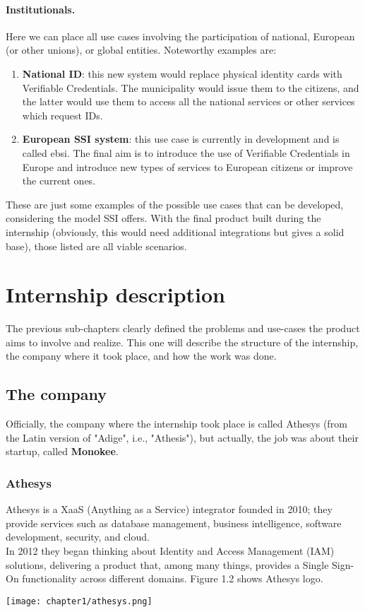 \paragraph{Institutionals.}
Here we can place all use cases involving the participation of national, 
European (or other unions), or global entities.
Noteworthy examples are:
\begin{enumerate}
    \item \textbf{National ID}: this new system would replace physical identity 
    cards with Verifiable Credentials. The municipality would issue them to the 
    citizens, and the latter would use them to access all the national services 
    or other services which request IDs.
    \item \textbf{European SSI system}: this use case is currently in development 
    and is called \acrfull{ebsi}. The final 
    aim is to introduce the use of Verifiable Credentials in Europe and introduce 
    new types of services to European citizens or improve the current 
    ones\cite{site:ebsi}.
\end{enumerate}
\vspace*{0.3cm}
These are just some examples of the possible use cases that can be developed, 
considering the model SSI offers.
With the final product built during the internship (obviously, this would need 
additional integrations but gives a solid base), those listed are all viable 
scenarios.
\section{Internship description}
The previous sub-chapters clearly defined the problems and use-cases the product 
aims to involve and realize. This one will describe the structure of the internship, 
the company where it took place, and how the work was done.
\subsection{The company}
Officially, the company where the internship took place is 
called Athesys (from the Latin version of "Adige", i.e., "Athesis"), but actually, 
the job was about their startup, called \textbf{Monokee}.
    \subsubsection{Athesys} 
    Athesys is a XaaS (Anything as a Service) integrator founded 
    in 2010; they provide     services such as database management, business 
    intelligence, software development, security, and cloud.\\
    In 2012 they began thinking about Identity and Access Management (IAM) solutions, 
    delivering a product that, among many things, provides a Single Sign-On 
    functionality across different domains. Figure 1.2 shows Athesys logo.
    \begin{center}
        \texttt{[image: chapter1/athesys.png]}
    \end{center}
